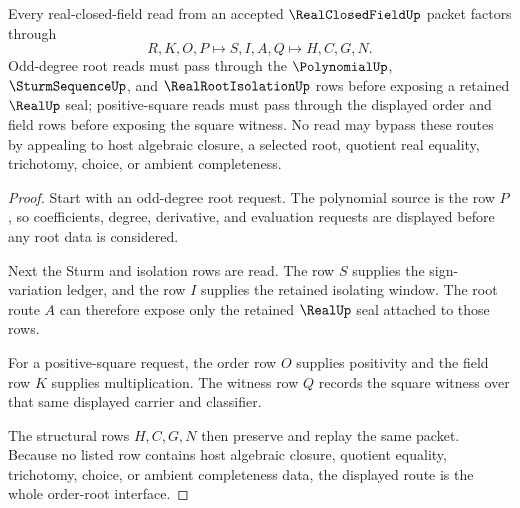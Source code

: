 \begin{theorem}
\label{thm:real-closed-field-order-root-route}
Every real-closed-field read from an accepted $\RealClosedFieldUp$ packet factors through
$$
R,K,O,P \longmapsto S,I,A,Q \longmapsto H,C,G,N .
$$
Odd-degree root reads must pass through the $\PolynomialUp$, $\SturmSequenceUp$, and $\RealRootIsolationUp$ rows before exposing a retained $\RealUp$ seal; positive-square reads must pass through the displayed order and field rows before exposing the square witness. No read may bypass these routes by appealing to host algebraic closure, a selected root, quotient real equality, trichotomy, choice, or ambient completeness.
\end{theorem}
\begin{proof}
Start with an odd-degree root request. The polynomial source is the row $P$, so coefficients, degree, derivative, and evaluation requests are displayed before any root data is considered.

Next the Sturm and isolation rows are read. The row $S$ supplies the sign-variation ledger, and the row $I$ supplies the retained isolating window. The root route $A$ can therefore expose only the retained $\RealUp$ seal attached to those rows.

For a positive-square request, the order row $O$ supplies positivity and the field row $K$ supplies multiplication. The witness row $Q$ records the square witness over that same displayed carrier and classifier.

The structural rows $H,C,G,N$ then preserve and replay the same packet. Because no listed row contains host algebraic closure, quotient equality, trichotomy, choice, or ambient completeness data, the displayed route is the whole order-root interface.
\end{proof}



